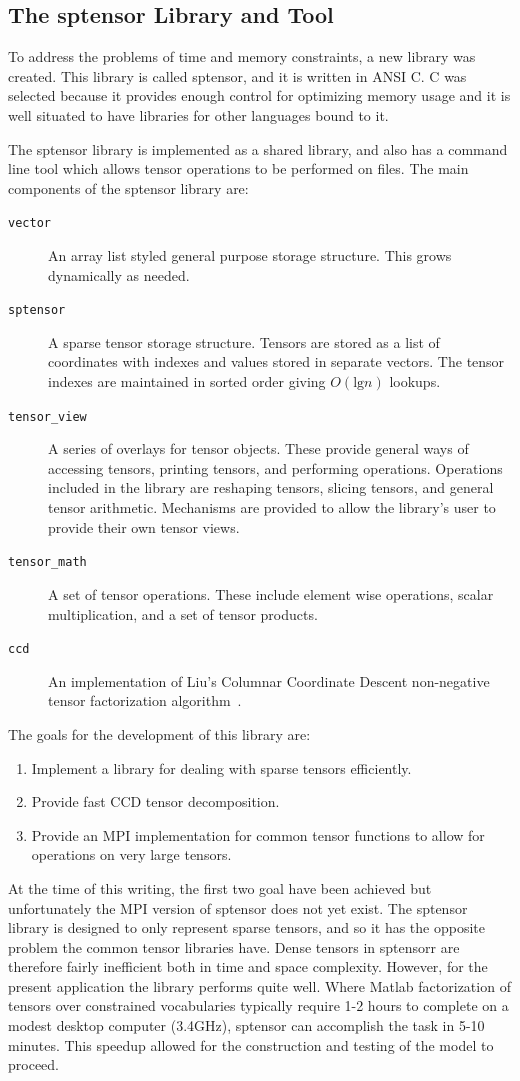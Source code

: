 \documentclass[../ut-dissertation.tex]{subfiles}
\begin{document}
\subsection{The sptensor Library and Tool}
To address the problems of time and memory constraints, a new library
was created.  This library is called sptensor, and it is written in
ANSI C.  C was selected because it provides enough control for
optimizing memory usage and it is well situated to have libraries for
other languages bound to it.

The sptensor library is implemented as a shared library, and also has a
command line tool which allows tensor operations to be performed on
files.  The main components of the sptensor library are:
\begin{description}
\item[{\tt vector}] An array list styled general purpose storage structure.
  This grows dynamically as needed.
\item[{\tt sptensor}] A sparse tensor storage structure.  Tensors are stored
  as a list of coordinates with indexes and values stored in separate
  vectors.  The tensor indexes are maintained in sorted order giving
  $O(\mathrm{lg} n)$ lookups.
\item[{\tt tensor\_view}] A series of overlays for tensor objects.  These
  provide general ways of accessing tensors, printing tensors, and
  performing operations.  Operations included in the library are
  reshaping tensors, slicing tensors, and general tensor arithmetic.
  Mechanisms are provided to allow the library's user to provide their
  own tensor views.
\item[{\tt tensor\_math}] A set of tensor operations.  These include
  element wise operations, scalar multiplication, and a set of tensor
  products.
\item[{\tt ccd}] An implementation of Liu's Columnar Coordinate
  Descent non-negative tensor factorization algorithm~\cite{liu2012sparse}.
\end{description}

The goals for the development of this library are:
\begin{enumerate}
  \item Implement a library for dealing with sparse tensors
    efficiently.
  \item Provide fast CCD tensor decomposition.
  \item Provide an MPI implementation for common tensor functions to
    allow for operations on very large tensors.
\end{enumerate}
At the time of this writing, the first two goal have been achieved but
unfortunately the MPI version of sptensor does not yet exist.  The
sptensor library is designed to only represent sparse tensors, and so
it has the opposite problem the common tensor libraries have.  Dense
tensors in sptensorr are therefore fairly inefficient both in time and
space complexity.  However, for the present application the library
performs quite well.  Where Matlab factorization of tensors over
constrained vocabularies typically require 1-2 hours to complete on a
modest desktop computer (3.4GHz), sptensor can accomplish the task in
5-10 minutes.  This speedup allowed for the construction and testing
of the model to proceed.
\end{document}
